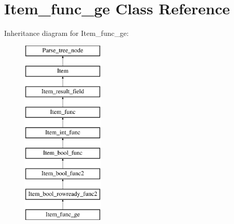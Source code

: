\hypertarget{classItem__func__ge}{}\section{Item\+\_\+func\+\_\+ge Class Reference}
\label{classItem__func__ge}
Inheritance diagram for Item\+\_\+func\+\_\+ge\+:\begin{figure}[H]
\begin{center}
\leavevmode
\includegraphics[height=9.000000cm]{classItem__func__ge}
\end{center}
\end{figure}
